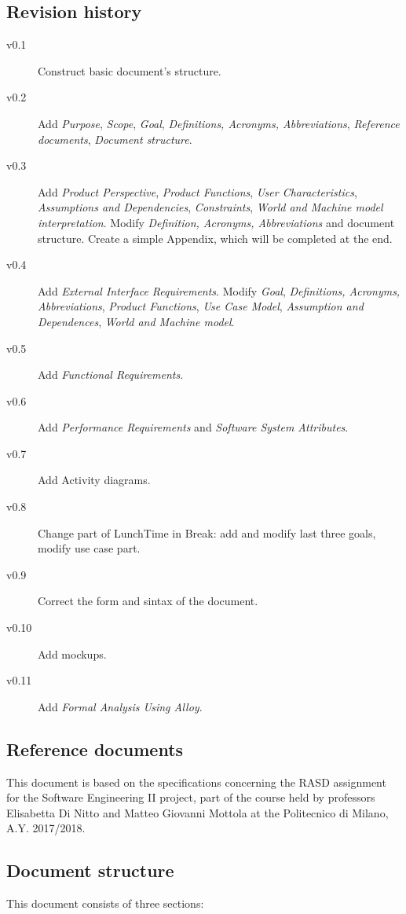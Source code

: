 \documentclass{article}
\begin{document}
	
	\subsection{Revision history}
	\begin{description}
		\item[v0.1] Construct basic document's structure.
		\item[v0.2] Add \textit{Purpose}, \textit{Scope}, \textit{Goal}, \textit{Definitions, Acronyms, Abbreviations}, \textit{Reference documents}, \textit{Document structure}.
		\item[v0.3] Add \textit{Product Perspective}, \textit{Product Functions}, \textit{User Characteristics}, \textit{Assumptions and Dependencies}, \textit{Constraints}, \textit{World and Machine model interpretation}. Modify \textit{Definition, Acronyms, Abbreviations} and document structure. Create a simple Appendix, which will be completed at the end.
		\item[v0.4] Add \textit{External Interface Requirements}. Modify \textit{Goal}, \textit{Definitions, Acronyms, Abbreviations}, \textit{Product Functions}, \textit{Use Case Model}, \textit{Assumption and Dependences}, \textit{World and Machine model}.
		\item[v0.5] Add \textit{Functional Requirements}.
		\item[v0.6] Add \textit{Performance Requirements} and \textit{Software System Attributes}.
		\item[v0.7] Add Activity diagrams.
		\item[v0.8] Change part of LunchTime in Break: add and modify last three goals, modify use case part.
		\item[v0.9] Correct the form and sintax of the document.
		\item[v0.10] Add mockups.
		\item[v0.11] Add \textit{Formal Analysis Using Alloy}.
	\end{description}
	
	
	\subsection{Reference documents}
	This document is based on the specifications concerning the RASD assignment for the Software Engineering II project, part of the course held by professors Elisabetta Di Nitto and Matteo Giovanni Mottola at the Politecnico di Milano, A.Y. 2017/2018.
	
	
	\subsection{Document structure}
	This document consists of three sections:
\end{document}

